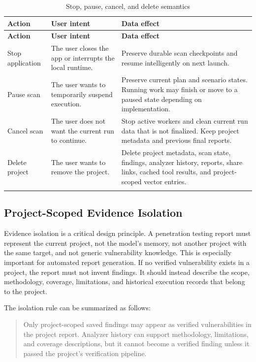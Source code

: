 \documentclass[12pt,a4paper]{report}
\begin{document}
\begin{longtable}{|p{}|p{}|p{}|}
\hline
\textbf{Action} & \textbf{User intent} & \textbf{Data effect} \\
\hline
\endfirsthead
\hline
\textbf{Action} & \textbf{User intent} & \textbf{Data effect} \\
\hline
\endhead
Stop application & The user closes the app or interrupts the local runtime. & Preserve
durable scan checkpoints and resume intelligently on next launch. \\
\hline
Pause scan & The user wants to temporarily suspend execution. & Preserve current plan
and scenario states. Running work may finish or move to a paused state depending on
implementation. \\
\hline
Cancel scan & The user does not want the current run to continue. & Stop active workers
and clean current run data that is not finalized. Keep project metadata and previous
final reports. \\
\hline
Delete project & The user wants to remove the project. & Delete project metadata,
scan state, findings, analyzer history, reports, share links, cached tool results, and
project-scoped vector entries. \\
\hline
\caption{Stop, pause, cancel, and delete semantics}
\label{tab:cancel_delete_policy}
\end{longtable}

\subsection{Project-Scoped Evidence Isolation}

Evidence isolation is a critical design principle. A penetration testing report must
represent the current project, not the model's memory, not another project with the
same target, and not generic vulnerability knowledge. This is especially important for
automated report generation. If no verified vulnerability exists in a project, the
report must not invent findings. It should instead describe the scope, methodology,
coverage, limitations, and historical execution records that belong to the project.

The isolation rule can be summarized as follows:

\begin{quote}
Only project-scoped saved findings may appear as verified vulnerabilities in the
project report. Analyzer history can support methodology, limitations, and coverage
descriptions, but it cannot become a verified finding unless it passed the project's
verification pipeline.
\end{quote}
\end{document}
